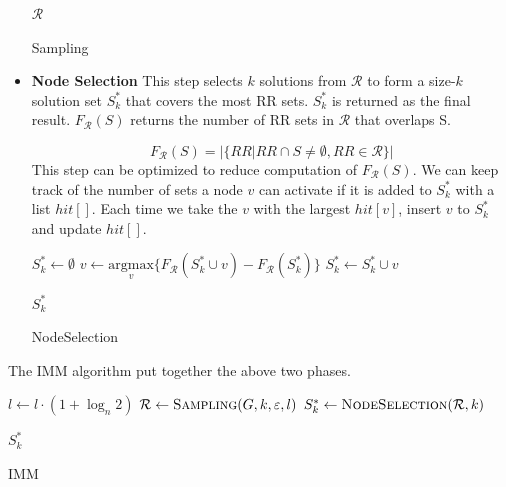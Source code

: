 \documentclass[conference]{IEEEtran}
\begin{document}
\begin{itemize}
\begin{algorithm}[H]
\begin{algorithmic}[1]
            \Return $\mathcal{R}$
            \EndFunction
            \end{algorithmic}
            \caption{Sampling}
        \end{algorithm}

        \item \textbf{Node Selection}
        This step selects $k$ solutions from $\mathcal{R}$ to form a size-$k$ solution set $S_{k}^*$ that covers the most RR sets. $S_{k}^*$ is returned as the final result. $F_{\mathcal{R}}(S)$ returns the number of RR sets in $\mathcal{R}$ that overlaps S. 
        
        $$F_{\mathcal{R}}(S) = \vert \{ RR|RR \cap S \neq \emptyset, RR \in \mathcal{R}\} \vert $$
        This step can be optimized to reduce computation of $F_{\mathcal{R}}(S)$. We can keep track of the number of sets a node $v$ can activate if it is added to $S_k^*$ with a list $hit[]$. Each time we take the $v$ with the largest $hit[v]$, insert $v$ to $S_k^*$ and update $hit[]$.
        \begin{algorithm}[H]
            \begin{algorithmic}[1]
            \State $S_k^{*} \gets \emptyset$
                \State $v \gets \underset{v}{\mathrm{argmax}} \{F_{\mathcal{R}}(S_k^* \cup v)-F_{\mathcal{R}}(S_k^*)\}$
                \State $S_k^* \gets S_k^* \cup v$
            \EndFor
            


            \Return $S_k^*$
            \EndFunction
            \end{algorithmic}
            \caption{NodeSelection}
        \end{algorithm}
    \end{itemize}

    The IMM algorithm put together the above two phases.

    \begin{algorithm}[H]
        \begin{algorithmic}[1]
        \State $l \gets l \cdot (1+\log_n 2)$
        \State $\mathcal{R} \gets \Call{Sampling}{G,k,\varepsilon,l}$
        \State $S_k^* \gets \Call{NodeSelection}{\mathcal{R},k}$

        \Return $S_k^*$
        \EndFunction
        \end{algorithmic}
        \caption{IMM}
    \end{algorithm}
\end{document}
